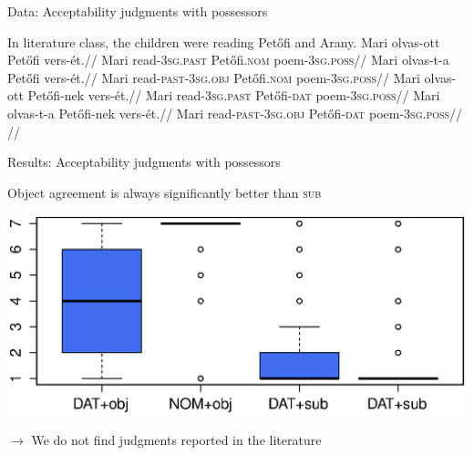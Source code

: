 \documentclass[12pt]{beamer}
\begin{document}
\begin{frame}{Data: Acceptability judgments with possessors}

    \pex In literature class, the children were reading Petőfi and Arany.
        \a
            \begingl
                \gla    Mari olvas-ott Petőfi vers-ét.//
                \glb    Mari read-\textsc{3sg.past} Petőfi.\textsc{nom} poem-\textsc{3sg.poss}//
            \endgl
        \a
            \begingl
                \gla    Mari olvas-t-a Petőfi vers-ét.//
                \glb    Mari read-\textsc{past-\alert{3sg.obj}} Petőfi.\textsc{nom} poem-\textsc{3sg.poss}//
            \endgl
        \a
            \begingl
                \gla    Mari olvas-ott Petőfi-nek vers-ét.//
                \glb    Mari read-\textsc{3sg.past} Petőfi-\textsc{\textcolor{red!70!black}{dat}} poem-\textsc{3sg.poss}//
            \endgl
        \a
            \begingl
                \gla    Mari olvas-t-a Petőfi-nek vers-ét.//
                \glb    Mari read-\textsc{past-\alert{3sg.obj}} Petőfi-\textsc{\textcolor{red!70!black}{dat}} poem-\textsc{3sg.poss}//
                \glft   {}//
            \endgl
    \xe

\end{frame}

\begin{frame}{Results: Acceptability judgments with possessors}

    Object agreement is always significantly better than \textsc{sub}

    \includegraphics[width=.9\linewidth]{nomdatcolor.eps}

    $\to$ We do not find judgments reported in the literature

\end{frame}
\end{document}
